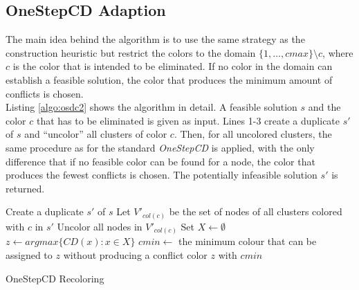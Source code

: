 \subsection{OneStepCD Adaption}
The main idea behind the algorithm is to use the same strategy as the construction heuristic but restrict the colors to the domain $\{1,\ldots,cmax\}\setminus c$, where $c$ is the color that is intended to be eliminated. If no color in the domain can establish a feasible solution, the color that produces the minimum amount of conflicts is chosen.\\
Listing \ref{algo:osdc2} shows the algorithm in detail. A feasible solution $s$ and the color $c$ that has to be eliminated is given as input. Lines 1-3 create a duplicate $s'$ of $s$ and ``uncolor'' all clusters of color $c$. Then, for all uncolored clusters, the same procedure as for the standard \textit{OneStepCD} is applied, with the only difference that if no feasible color can be found for a node, the color that produces the fewest conflicts is chosen. The potentially infeasible solution $s'$ is returned.

\begin{algorithm}[h]
Create a duplicate $s'$ of $s$\;
Let $V'_{col(c)}$ be the set of nodes of all clusters colored with $c$ in $s'$\;
Uncolor all nodes in $V'_{col(c)}$\;
 {
  Set $X \gets \emptyset $\;
  $z \gets argmax\{CD(x) : x \in X \}$\;
  $cmin \gets$ the minimum colour that can be assigned to $z$ without producing a conflict\;
  color $z$ with $cmin$\;
}
\;
\caption{OneStepCD Recoloring}
\label{algo:osdc2}
\end{algorithm}

\clearpage

